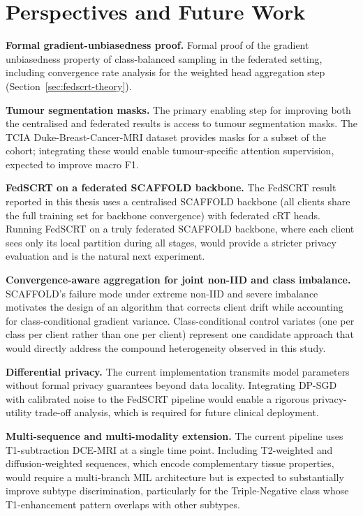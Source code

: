 \section*{Perspectives and Future Work}
\label{sec:future-work}

\textbf{Formal gradient-unbiasedness proof.}
Formal proof of the gradient unbiasedness property of
class-balanced sampling in the federated setting, including
convergence rate analysis for the weighted head aggregation
step (Section~\ref{sec:fedscrt-theory}).

\textbf{Tumour segmentation masks.}
The primary enabling step for improving both the
centralised and federated results is access to tumour
segmentation masks.
The TCIA Duke-Breast-Cancer-MRI dataset provides masks
for a subset of the cohort; integrating these would
enable tumour-specific attention supervision,
expected to improve macro F1.

\textbf{FedSCRT on a federated SCAFFOLD backbone.}
The FedSCRT result reported in this thesis uses a
centralised SCAFFOLD backbone (all clients share the
full training set for backbone convergence) with federated
cRT heads.
Running FedSCRT on a truly federated SCAFFOLD backbone,
where each client sees only its local partition during
all stages, would provide a stricter privacy evaluation
and is the natural next experiment.

\textbf{Convergence-aware aggregation for joint non-IID
and class imbalance.}
SCAFFOLD's failure mode under extreme non-IID and
severe imbalance motivates the design of an algorithm
that corrects client drift while accounting for
class-conditional gradient variance.
Class-conditional control variates (one per class per
client rather than one per client) represent one
candidate approach that would directly address the
compound heterogeneity observed in this study.

\textbf{Differential privacy.}
The current implementation transmits model parameters
without formal privacy guarantees beyond data locality.
Integrating DP-SGD \cite{abadi2016deep} with calibrated
noise to the FedSCRT pipeline would enable a rigorous
privacy-utility trade-off analysis, which is required
for future clinical deployment.

\textbf{Multi-sequence and multi-modality extension.}
The current pipeline uses T1-subtraction DCE-MRI at a
single time point.
Including T2-weighted and diffusion-weighted sequences,
which encode complementary tissue properties,
would require a multi-branch MIL architecture but is
expected to substantially improve subtype discrimination,
particularly for the Triple-Negative class whose
T1-enhancement pattern overlaps with other subtypes.
